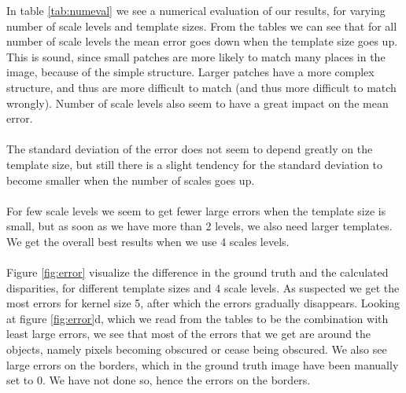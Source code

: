 \documentclass[12pt,a4paper,oneside,final]{article}
\begin{document}
	In table \ref{tab:numeval} we see a numerical evaluation of our results, for varying number of scale levels and template sizes. From the tables we can see that for all number of scale levels the mean error goes down when the template size goes up. This is sound, since small patches are more likely to match many places in the image, because of the simple structure. Larger patches have a more complex structure, and thus are more difficult to match (and thus more difficult to match wrongly). Number of scale levels also seem to have a great impact on the mean error.\\\\
	The standard deviation of the error does not seem to depend greatly on the template size, but still there is a slight tendency for the standard deviation to become smaller when the number of scales goes up.\\\\
	For few scale levels we seem to get fewer large errors when the template size is small, but as soon as we have more than 2 levels, we also need larger templates. We get the overall best results when we use 4 scales levels. \\\\
	Figure \ref{fig:error} visualize the difference in the ground truth and the calculated disparities, for different template sizes and 4 scale levels. As suspected we get the most errors for kernel size 5, after which the errors gradually disappears. Looking at figure \ref{fig:error}d, which we read from the tables to be the combination with least large errors, we see that most of the errors that we get are around the objects, namely pixels becoming obscured or cease being obscured. We also see large errors on the borders, which in the ground truth image have been manually set to 0. We have not done so, hence the errors on the borders.
	
\end{document}
